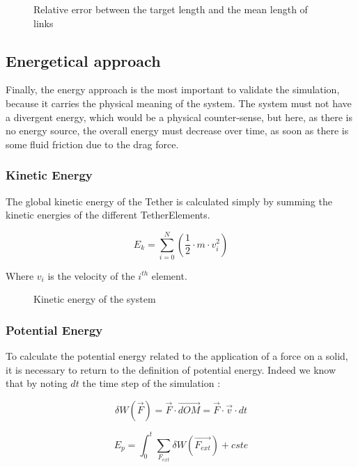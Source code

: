 \begin{figure}[!htb]
    \centering
    
    \caption{Relative error between the target length and the mean length of links}
    \label{fig:error_length}
\end{figure}

\subsection{Energetical approach}

Finally, the energy approach is the most important to validate the simulation, because it carries the physical meaning of the system. The system must not have a divergent energy, which would be a physical counter-sense, but here, as there is no energy source, the overall energy must decrease over time, as soon as there is some fluid friction due to the drag force.

\subsubsection{Kinetic Energy}

The global kinetic energy of the Tether is calculated simply by summing the kinetic energies of the different TetherElements.

$$E_{k} = \sum_{i=0}^N \left(\frac{1}{2} \cdot m \cdot v_i^2 \right)$$

Where $v_i$ is the velocity of the $i^{th}$ element.

\begin{figure}[!htb]
    \centering
    
    \caption{Kinetic energy of the system}
    \label{fig:kinetic_energy}
\end{figure}

\subsubsection{Potential Energy}

To calculate the potential energy related to the application of a force on a solid, it is necessary to return to the definition of potential energy. Indeed we know that by noting $dt$ the time step of the simulation :

$$\delta W(\overrightarrow{F}) = \overrightarrow{F} \cdot \overrightarrow{dOM} = \overrightarrow{F} \cdot \overrightarrow{v} \cdot dt$$

$$E_p = \int_0^t \sum_{F_{ext}} \delta W(\overrightarrow{F_{ext}}) + cste$$

